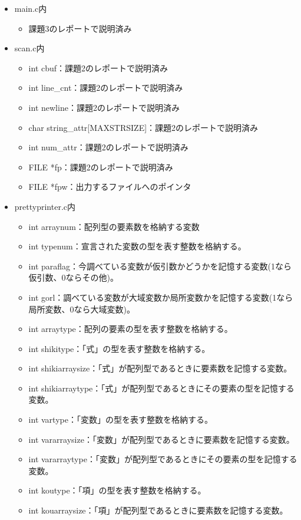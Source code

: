 \documentclass{jarticle}
\begin{document}
\begin{itemize}
  \item main.c内
  \begin{itemize}
    \item 課題3のレポートで説明済み
  \end{itemize}
  \item scan.c内
  \begin{itemize}
    \item int cbuf：課題2のレポートで説明済み
    \item int line\_cnt：課題2のレポートで説明済み
    \item int newline：課題2のレポートで説明済み
    \item char string\_attr[MAXSTRSIZE]：課題2のレポートで説明済み
    \item int num\_attr：課題2のレポートで説明済み
    \item FILE *fp：課題2のレポートで説明済み
    \item FILE *fpw：出力するファイルへのポインタ
  \end{itemize}
  \item prettyprinter.c内
  \begin{itemize}
    \item int arraynum：配列型の要素数を格納する変数
    \item int typenum：宣言された変数の型を表す整数を格納する。
    \item int paraflag：今調べている変数が仮引数かどうかを記憶する変数(1なら仮引数、0ならその他)。
    \item int gorl：調べている変数が大域変数か局所変数かを記憶する変数(1なら局所変数、0なら大域変数)。
    \item int arraytype：配列の要素の型を表す整数を格納する。
    \item int shikitype：「式」の型を表す整数を格納する。
    \item int shikiarraysize：「式」が配列型であるときに要素数を記憶する変数。
    \item int shikiarraytype：「式」が配列型であるときにその要素の型を記憶する変数。
    \item int vartype：「変数」の型を表す整数を格納する。
    \item int vararraysize：「変数」が配列型であるときに要素数を記憶する変数。
    \item int vararraytype：「変数」が配列型であるときにその要素の型を記憶する変数。
    \item int koutype：「項」の型を表す整数を格納する。
    \item int kouarraysize：「項」が配列型であるときに要素数を記憶する変数。

\end{itemize}
\end{itemize}
\end{document}
